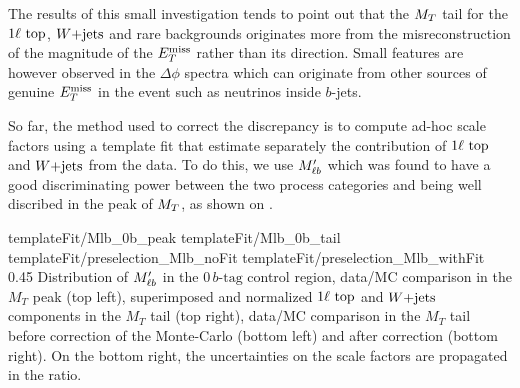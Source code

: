     The results of this small investigation tends to point out that the $M_T$ tail for
    the $1\ell~\text{top}$, $\text{$W$+jets}$ and rare backgrounds originates more from the
    misreconstruction of the magnitude of the $E_T^\text{miss}$ rather than its direction. Small
    features are however observed in the $\Delta \phi$ spectra which can originate from
    other sources of genuine $E_T^\text{miss}$ in the event such as neutrinos inside $b$-jets.

    So far, the method used to correct the discrepancy is to compute ad-hoc scale factors
    using a template fit that estimate separately the contribution of $1\ell~\text{top}$ and
    $\text{$W$+jets}$ from the data. To do this, we use $M'_{\ell b}$ which was found to have a good
    discriminating power between the two process categories and being well discribed in
    the peak of $M_T$, as shown on .

                          {templateFit/Mlb_0b_peak}
                          {templateFit/Mlb_0b_tail}
                          {templateFit/preselection_Mlb_noFit}
                          {templateFit/preselection_Mlb_withFit}
                          {0.45}
                          {Distribution of $M'_{\ell b}$ in the $0\, b\text{-tag}$ control region, data/MC comparison in the $M_T$ peak (top left), superimposed and normalized $1\ell~\text{top}$ and $\text{$W$+jets}$ components in the $M_T$ tail (top right), data/MC comparison in the $M_T$ tail before correction of the Monte-Carlo (bottom left) and after correction (bottom right). On the bottom right, the uncertainties on the scale factors are propagated in the ratio.}


